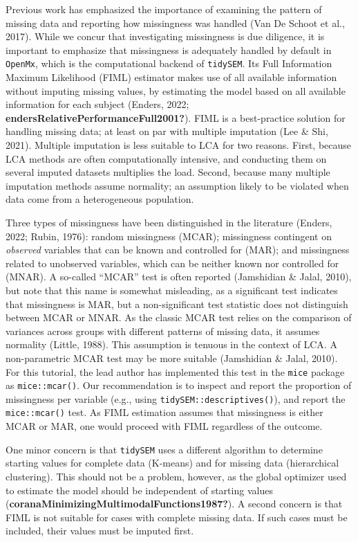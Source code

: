 \documentclass[
  ,man,floatsintext]{apa6}
\begin{document}
Previous work has emphasized the importance of examining the pattern of
missing data and reporting how missingness was handled
(Van De Schoot et al., 2017). While we concur that
investigating missingness is due diligence, it is important to emphasize
that missingness is adequately handled by default in \texttt{OpenMx}, which is
the computational backend of \texttt{tidySEM}. Its Full Information Maximum
Likelihood (FIML) estimator makes use of all available information
without imputing missing values, by estimating the model based on all
available information for each subject
(Enders, 2022; \textbf{endersRelativePerformanceFull2001?}). FIML is a
best-practice solution for handling missing data; at least on par with
multiple imputation (Lee \& Shi, 2021). Multiple imputation is less
suitable to LCA for two reasons. First, because LCA methods are often
computationally intensive, and conducting them on several imputed
datasets multiplies the load. Second, because many multiple imputation
methods assume normality; an assumption likely to be violated when data
come from a heterogeneous population.

Three types of missingness have been distinguished in the literature
(Enders, 2022; Rubin, 1976): random missingness
(MCAR); missingness contingent on \emph{observed} variables that can be known
and controlled for (MAR); and missingness related to unobserved
variables, which can be neither known nor controlled for (MNAR). A
so-called ``MCAR'' test is often reported (Jamshidian \& Jalal, 2010), but
note that this name is somewhat misleading, as a significant test
indicates that missingness is MAR, but a non-significant test statistic
does not distinguish between MCAR or MNAR. As the classic MCAR test
relies on the comparison of variances across groups with different
patterns of missing data, it assumes normality (Little, 1988). This
assumption is tenuous in the context of LCA. A non-parametric MCAR test
may be more suitable (Jamshidian \& Jalal, 2010). For this tutorial, the
lead author has implemented this test in the \texttt{mice} package as
\texttt{mice::mcar()}. Our recommendation is to inspect and report the
proportion of missingness per variable (e.g., using
\texttt{tidySEM::descriptives()}), and report the \texttt{mice::mcar()} test. As FIML
estimation assumes that missingness is either MCAR or MAR, one would
proceed with FIML regardless of the outcome.

One minor concern is that \texttt{tidySEM} uses a different algorithm to
determine starting values for complete data (K-means) and for missing
data (hierarchical clustering). This should not be a problem, however,
as the global optimizer used to estimate the model should be independent
of starting values (\textbf{coranaMinimizingMultimodalFunctions1987?}). A second
concern is that FIML is not suitable for cases with complete missing
data. If such cases must be included, their values must be imputed
first.
\end{document}
